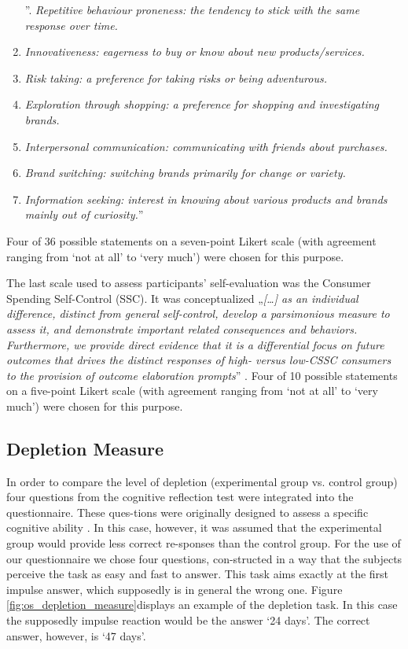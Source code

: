 \begin{enumerate}[label=\emph{\alph*}.]
\item [”\stepcounter{enumi}\emph{\alph{enumi}}.]\emph{Repetitive behaviour proneness: the tendency to stick with the same response over time. }
\item \emph{Innovativeness: eagerness to buy or know about new products/services. }
\item \emph{Risk taking: a preference for taking risks or being adventurous. }
\item \emph{Exploration through shopping: a preference for shopping and investigating brands. }
\item \emph{Interpersonal communication: communicating with friends about purchases. }
\item \emph{Brand switching: switching brands primarily for change or variety. }
\item \emph{Information seeking: interest in knowing about various products and brands mainly out of curiosity.}” \citep{raju1980optimum}
\end{enumerate}
Four of 36 possible statements on a seven-point Likert scale (with agreement ranging from ‘not at all’ to ‘very much’) were chosen for this purpose.\par
The last scale used to assess participants’ self-evaluation was the Consumer Spending Self-Control (SSC). It was conceptualized „\emph{[\ldots] as an individual difference, distinct from general self-control, develop a parsimonious measure to assess it, and demonstrate important related consequences and behaviors. Furthermore, we provide direct evidence that it is a differential focus on future outcomes that drives the distinct responses of high- versus low-CSSC consumers to the provision of outcome elaboration prompts}” \citep{haws2012consumer}. Four of 10 possible statements on a five-point Likert scale (with agreement ranging from ‘not at all’ to ‘very much’) were chosen for this purpose.\par

\subsection{Depletion Measure}
In order to compare the level of depletion (experimental group vs. control group) four questions from the cognitive reflection test were integrated into the questionnaire. These ques-tions were originally designed to assess a specific cognitive ability \citep{frederick2005cognitive}. In this case, however, it was assumed that the experimental group would provide less correct re-sponses than the control group. For the use of our questionnaire we chose four questions, con-structed in a way that the subjects perceive the task as easy and fast to answer. This task aims exactly at the first impulse answer, which supposedly is in general the wrong one.  Figure \ref{fig:os_depletion_measure}displays an example of the depletion task. In this case the supposedly impulse reaction would be the answer ‘24 days’. The correct answer, however, is ‘47 days’.  \par

